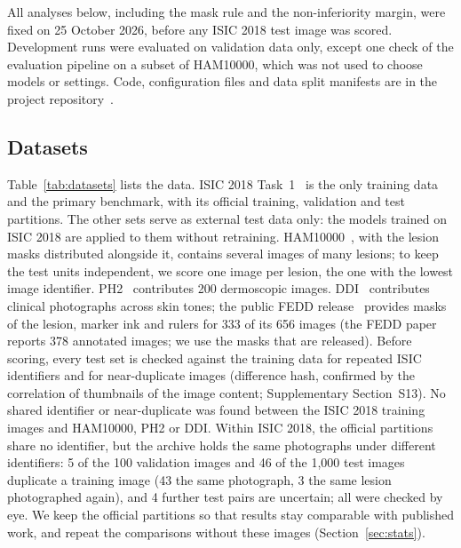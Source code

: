All analyses below, including the mask rule and the non-inferiority margin, were fixed on 25 October 2026, before any ISIC 2018 test image was scored. Development runs were evaluated on validation data only, except one check of the evaluation pipeline on a subset of HAM10000, which was not used to choose models or settings. Code, configuration files and data split manifests are in the project repository~.

\subsection{Datasets}
Table~\ref{tab:datasets} lists the data. ISIC 2018 Task~1~\cite{codella2019isic2018} is the only training data and the primary benchmark, with its official training, validation and test partitions. The other sets serve as external test data only: the models trained on ISIC 2018 are applied to them without retraining. HAM10000~\cite{tschandl2018ham10000}, with the lesion masks distributed alongside it, contains several images of many lesions; to keep the test units independent, we score one image per lesion, the one with the lowest image identifier. PH2~\cite{mendonca2013ph2} contributes 200 dermoscopic images. DDI~\cite{daneshjou2022ddi} contributes clinical photographs across skin tones; the public FEDD release~\cite{carrion2023fedd} provides masks of the lesion, marker ink and rulers for 333 of its 656 images (the FEDD paper reports 378 annotated images; we use the masks that are released). Before scoring, every test set is checked against the training data for repeated ISIC identifiers and for near-duplicate images (difference hash, confirmed by the correlation of thumbnails of the image content; Supplementary Section~S13). No shared identifier or near-duplicate was found between the ISIC 2018 training images and HAM10000, PH2 or DDI. Within ISIC 2018, the official partitions share no identifier, but the archive holds the same photographs under different identifiers: 5 of the 100 validation images and 46 of the 1,000 test images duplicate a training image (43 the same photograph, 3 the same lesion photographed again), and 4 further test pairs are uncertain; all were checked by eye. We keep the official partitions so that results stay comparable with published work, and repeat the comparisons without these images (Section~\ref{sec:stats}).

